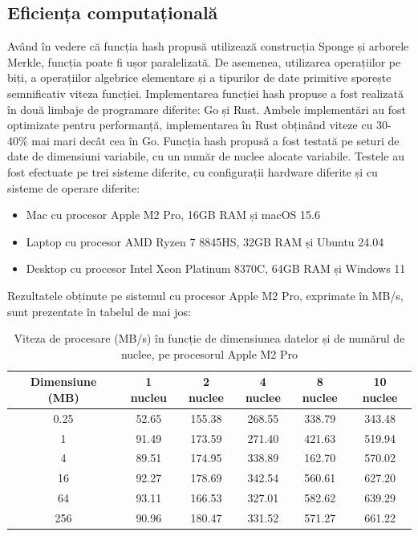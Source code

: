 \subsection{Eficiența computațională}
Având în vedere că funcția hash propusă utilizează construcția Sponge și arborele Merkle, funcția poate fi ușor paralelizată.
De asemenea, utilizarea operațiilor pe biți, a operațiilor algebrice elementare și a tipurilor de date primitive sporește semnificativ viteza funcției.
Implementarea funcției hash propuse a fost realizată în două limbaje de programare diferite: Go și Rust.
Ambele implementări au fost optimizate pentru performanță, implementarea în Rust obținând viteze cu 30-40\% mai mari decât cea în Go.
Funcția hash propusă a fost testată pe seturi de date de dimensiuni variabile, cu un număr de nuclee alocate variabile.
Testele au fost efectuate pe trei sisteme diferite, cu configurații hardware diferite și cu sisteme de operare diferite:

\begin{itemize}
    \item Mac cu procesor Apple M2 Pro, 16GB RAM și macOS 15.6
    \item Laptop cu procesor AMD Ryzen 7 8845HS, 32GB RAM și Ubuntu 24.04
    \item Desktop cu procesor Intel Xeon Platinum 8370C, 64GB RAM și Windows 11
\end{itemize}

Rezultatele obținute pe sistemul cu procesor Apple M2 Pro, exprimate în MB/s, sunt prezentate în tabelul de mai jos:

\begin{table}[!htbp]
    \centering
    \begin{tabular}{|c|c|c|c|c|c|}
        \hline
        \textbf{Dimensiune (MB)} & \textbf{1 nucleu} & \textbf{2 nuclee} & \textbf{4 nuclee} & \textbf{8 nuclee} & \textbf{10 nuclee} \\
        \hline
        0.25 & 52.65 & 155.38 & 268.55 & 338.79 & 343.48 \\
        \hline
        1    & 91.49 & 173.59 & 271.40 & 421.63 & 519.94 \\
        \hline
        4    & 89.51 & 174.95 & 338.89 & 162.70 & 570.02 \\
        \hline
        16   & 92.27 & 178.69 & 342.54 & 560.61 & 627.20 \\
        \hline
        64   & 93.11 & 166.53 & 327.01 & 582.62 & 639.29 \\
        \hline
        256  & 90.96 & 180.47 & 331.52 & 571.27 & 661.22 \\
        \hline
    \end{tabular}
    \caption{Viteza de procesare (MB/s) în funcție de dimensiunea datelor și de numărul de nuclee, pe procesorul Apple M2 Pro}
    \label{tab:viteza-m2}
\end{table}

